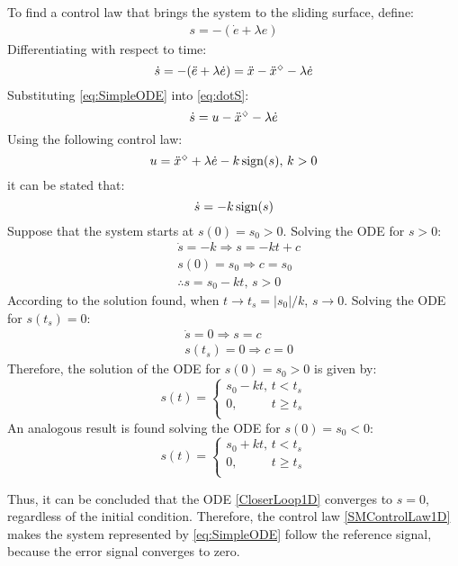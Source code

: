 To find a control law that brings the system to the sliding surface, define:
\begin{align*} 
s = -(\dot{e} + \lambda e) 
\end{align*} 
Differentiating with respect to time:
\begin{equation} \label{eq:dotS}
\dot{s} =  -(\ddot{e} + \lambda \dot{e}) = \ddot{x} - \ddot{x}^{\scriptscriptstyle \diamondsuit} - \lambda \dot{e} 
\end{equation}
Substituting \eqref{eq:SimpleODE} into \eqref{eq:dotS}:
\begin{equation} \label{dotS2}
\dot{s} = u - \ddot{x}^{\scriptscriptstyle \diamondsuit} - \lambda \dot{e}
\end{equation}
Using the following control law:
\begin{equation} \label{SMControlLaw1D}
u = \ddot{x}^{\scriptscriptstyle \diamondsuit} + \lambda \dot{e} - k \operatorname*{sign} (s), \, k>0
\end{equation}
it can be stated that:
\begin{equation} \label{CloserLoop1D}
\dot{s} = -k \operatorname*{sign}(s) 
\end{equation}
Suppose that the system starts at $s(0) = s_0 >0$. Solving the ODE for $s>0$:
\begin{align*}
& \dot{s} = -k \Rightarrow s = -k t + c \\
& s(0) = s_0 \Rightarrow c = s_0 \\
& \therefore s = s_0 - k t, \, s>0 
\end{align*}
According to the solution found, when $t \rightarrow t_s = {|s_0|}/{k}$, $s \rightarrow 0 $. Solving the ODE for $s(t_s) = 0$:
\begin{align*}
& \dot{s} = 0 \Rightarrow s =  c \\
& s(t_s) = 0 \Rightarrow c = 0 
\end{align*}
Therefore, the solution of the ODE for $s(0) = s_0 > 0$ is given by:
\begin{equation} \label{eq:SM-ODE-Sol1}
s(t) =
\begin{cases}
s_0 - k t, \, t < t_s \\
0, \,\,\,\,\,\,\,\,\,\,\,\,\,\,\,\, t \geq t_s \\
\end{cases}
\end{equation}
An analogous result is found solving the ODE for $s(0) = s_0 < 0$:
\begin{equation} \label{eq:SM-ODE-Sol2}
s(t) =
\begin{cases}
s_0 + k t, \, t < t_s \\
0, \,\,\,\,\,\,\,\,\,\,\,\,\,\,\,\, t \geq t_s \\
\end{cases}
\end{equation}

Thus, it can be concluded that the ODE \eqref{CloserLoop1D} converges to $s=0$, regardless of the initial condition.
Therefore, the control law \eqref{SMControlLaw1D} makes the system represented by \eqref{eq:SimpleODE} follow the reference signal, because the error signal converges to zero.


